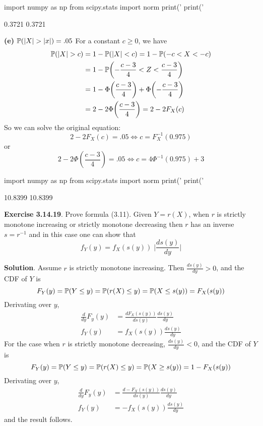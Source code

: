 \begin{python}
import numpy as np
from scipy.stats import norm
print('%
print('%
\end{python}
\begin{console}
0.3721
0.3721
\end{console}
\textbf{(e)} \(\operatorname{\mathbb{P}}(|X| > |x|) = .05\)
For a constant \(c \geq 0\), we have
\begin{align*}
\PROB(|X| > c) &= 1 - \PROB(|X| < c) = 1 - \PROB(-c < X < -c) \\
&= 1 - \PROB\left( -\frac{c - 3}{4} < Z < \frac{c - 3}{4} \right)\\
&= 1 - \Phi\left( \frac{c - 3}{4} \right) + \Phi\left( -\frac{c - 3}{4} \right) \\
&= 2 - 2 \Phi\left( \frac{c - 3}{4} \right) = 2 - 2 F_X(c)
\end{align*}
So we can solve the original equation:
\[
2 - 2 F_X(c) = .05 \Longleftrightarrow c = F_X^{-1}(0.975)
\]
or
\[
2 - 2 \Phi\left( \frac{c - 3}{4} \right) = .05 \Longleftrightarrow c = 4 \Phi^{-1}(0.975) + 3
\]

\begin{python}
import numpy as np
from scipy.stats import norm
print('%
print('%
\end{python}
\begin{console}
10.8399
10.8399
\end{console}

\textbf{Exercise 3.14.19}. Prove formula (3.11).
Given \(Y = r(X)\), when \(r\) is strictly monotone increasing or
strictly monotone decreasing then \(r\) has an inverse \(s = r^{-1}\)
and in this case one can show that
\[
f_Y(y) = f_X(s(y)) \;\Bigg| \frac{ds(y)}{dy} \Bigg|
\]

\textbf{Solution}.
Assume \(r\) is strictly monotone increasing. Then $ \frac{d s(y)}{dy}
> 0$, and the CDF of \(Y\) is
\[
F_Y(y) = \operatorname{\mathbb{P}}(Y \leq y) = \operatorname{\mathbb{P}}(r(X) \leq y) = \operatorname{\mathbb{P}}(X \leq s(y)) = F_X(s(y))
\]
Derivating over \(y\),
\begin{align*}
\frac{d}{dy} F_y(y) &= \frac{d F_X(s(y))}{d s(y)} \frac{d s(y)}{dy} \\
f_Y(y) &= f_X(s(y)) \frac{d s(y)}{dy}
\end{align*}
For the case when \(r\) is strictly monotone decreasing, $
\frac{d s(y)}{dy} < 0$, and the CDF of \(Y\) is
\[
F_Y(y) = \operatorname{\mathbb{P}}(Y \leq y) = \operatorname{\mathbb{P}}(r(X) \leq y) = \operatorname{\mathbb{P}}(X \geq s(y)) = 1 - F_X(s(y))
\]
Derivating over \(y\),
\begin{align*}
\frac{d}{dy} F_y(y) &= \frac{d -F_X(s(y))}{d s(y)} \frac{d s(y)}{dy} \\
f_Y(y) &= -f_X(s(y)) \frac{d s(y)}{dy}
\end{align*}
and the result follows.

